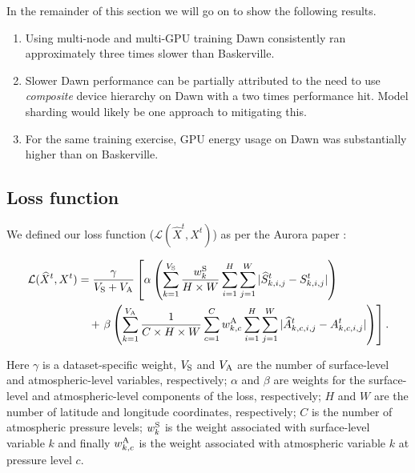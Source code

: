 In the remainder of this section we will go on to show the following results.

\begin{enumerate}
    \item Using multi-node and multi-GPU training Dawn consistently ran approximately three times slower than Baskerville.
    \item Slower Dawn performance can be partially attributed to the need to use \textit{composite} device hierarchy on Dawn with a two times performance hit. Model sharding would likely be one approach to mitigating this.
    \item For the same training exercise, GPU energy usage on Dawn was substantially higher than on Baskerville.
\end{enumerate}

\subsection{Loss function}
\label{section:loss}

We defined our loss function (${\mathcal{L}}({\widehat{X}}^{t},{X}^{t})$) as per the Aurora paper \cite{bodnar_foundation_2025}:

\begin{align*}
{\mathcal{L}}({\widehat{X}}^{t},{X}^{t}) & = \frac{\gamma }{{V}_{{\rm{S}}}+{V}_{{\rm{A}}}}\left[\alpha \left(\mathop{\sum }\limits_{k=1}^{{V}_{{\rm{S}}}}\frac{{w}_{k}^{{\rm{S}}}}{H\times W}\mathop{\sum }\limits_{i=1}^{H}\mathop{\sum }\limits_{j=1}^{W}| {\widehat{S}}_{k,i,j}^{t}-{S}_{k,i,j}^{t}| \right)\right. \\
& \quad + \left.\beta \left(\mathop{\sum }\limits_{k=1}^{{V}_{{\rm{A}}}}\frac{1}{C\times H\times W}\mathop{\sum }\limits_{c=1}^{C}{w}_{k,c}^{{\rm{A}}}\mathop{\sum }\limits_{i=1}^{H}\mathop{\sum }\limits_{j=1}^{W}| {\widehat{A}}_{k,c,i,j}^{t}-{A}_{k,c,i,j}^{t}| \right)\right].
\end{align*}

Here $\gamma$ is a dataset-specific weight, ${V}_{{\rm{S}}}$ and ${V}_{{\rm{A}}}$ are the number of surface-level and atmospheric-level variables, respectively; $\alpha$ and $\beta$ are weights for the surface-level and atmospheric-level components of the loss, respectively; $H$ and $W$ are the number of latitude and longitude coordinates, respectively; $C$ is the number of atmospheric pressure levels; ${w}_{k}^{{\rm{S}}}$ is the weight associated with surface-level variable $k$ and finally ${w}_{k,c}^{{\rm{A}}}$ is the weight associated with atmospheric variable $k$ at pressure level $c$.


